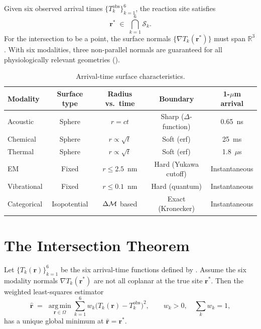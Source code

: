 Given six observed arrival times $\{T_k^{\mathrm{obs}}\}_{k=1}^{6}$, the
reaction site satisfies
\begin{equation}
  \mathbf{r}^{*}
  \;\in\; \bigcap_{k=1}^{6} \mathcal{S}_k.
  \label{eq:intersection}
\end{equation}
For the intersection to be a point, the surface normals
$\{\nabla T_k(\mathbf{r}^{*})\}$ must span $\mathbb{R}^3$.  With six
modalities, three non-parallel normals are guaranteed for all physiologically
relevant geometries ().

\begin{table}[!htbp]
\centering
\caption{Arrival-time surface characteristics.}
\label{tab:arrival-surfaces}
\begin{tabular}{lcccc}
\toprule
Modality & Surface type & Radius vs.\ time & Boundary & 1-$\mu$m arrival \\
\midrule
Acoustic    & Sphere    & $r = ct$               & Sharp ($\Delta$-function)  & 0.65~ns \\
Chemical    & Sphere    & $r \propto \sqrt{t}$   & Soft (erf)                 & 25~ms \\
Thermal     & Sphere    & $r \propto \sqrt{t}$   & Soft (erf)                 & 1.8~$\mu$s \\
EM          & Fixed     & $r \le 2.5$~nm         & Hard (Yukawa cutoff)       & Instantaneous \\
Vibrational & Fixed     & $r \le 0.1$~nm         & Hard (quantum)             & Instantaneous \\
Categorical & Isopotential & $\Delta\mathcal{M}$ based & Exact (Kronecker)        & Instantaneous \\
\bottomrule
\end{tabular}
\end{table}

\section{The Intersection Theorem}
\label{sec:intersection-theorem}

\begin{theorem}
\label{thm:uniqueness}
Let $\{T_k(\mathbf{r})\}_{k=1}^{6}$ be the six arrival-time functions
defined by .
Assume the six modality normals $\nabla T_k(\mathbf{r}^{*})$ are not all
coplanar at the true site $\mathbf{r}^{*}$.  Then the weighted least-squares
estimator
\begin{equation}
  \hat{\mathbf{r}}
  \;=\; \operatorname*{arg\,min}_{\mathbf{r} \in \Omega}
    \sum_{k=1}^{6} w_k \bigl(T_k(\mathbf{r}) - T_k^{\mathrm{obs}}\bigr)^{2},
  \qquad
  w_k > 0,\quad \sum_k w_k = 1,
  \label{eq:least-squares}
\end{equation}
has a unique global minimum at $\hat{\mathbf{r}} = \mathbf{r}^{*}$.
\end{theorem}

